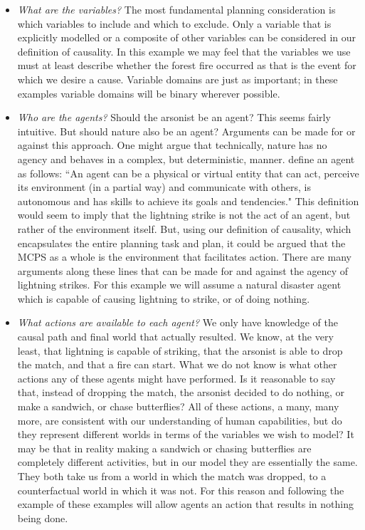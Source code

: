 \documentclass{article}
\theoremstyle{plain}
\theoremstyle{definition}
\begin{document}
\begin{itemize}

\item \textit{What are the variables?} The most fundamental planning consideration is which variables to include and which to exclude. Only a variable that is explicitly modelled or a composite of other variables can be considered in our definition of causality. In this example we may feel that the variables we use must at least describe whether the forest fire occurred as that is the event for which we desire a cause. Variable domains are just as important; in these examples variable domains will be binary wherever possible.

\item \textit{Who are the agents?} Should the arsonist be an agent? This seems fairly intuitive. But should nature also be an agent? Arguments can be made for or against this approach. One might argue that technically, nature has no agency and behaves in a complex, but deterministic, manner. \citet{ferber1999multi} define an agent as follows: ``An agent can be a physical or virtual entity that can act, perceive its environment (in a partial way) and communicate with others, is autonomous and has skills to achieve its goals and tendencies." This definition would seem to imply that the lightning strike is not the act of an agent, but rather of the environment itself. But, using our definition of causality, which encapsulates the entire planning task and plan, it could be argued that the MCPS as a whole is the environment that facilitates action. There are many arguments along these lines that can be made for and against the agency of lightning strikes. For this example we will assume a natural disaster agent which is capable of causing lightning to strike, or of doing nothing.

\item \textit{What actions are available to each agent?} We only have knowledge of the causal path and final world that actually resulted. We know, at the very least, that lightning is capable of striking, that the arsonist is able to drop the match, and that a fire can start. What we do not know is what other actions any of these agents might have performed. Is it reasonable to say that, instead of dropping the match, the arsonist decided to do nothing, or make a sandwich, or chase butterflies? All of these actions, a many, many more, are consistent with our understanding of human capabilities, but do they represent different worlds in terms of the variables we wish to model? It may be that in reality making a sandwich or chasing butterflies are completely different activities, but in our model they are essentially the same. They both take us from a world in which the match was dropped, to a counterfactual world in which it was not. For this reason and following the example of \cite{lind2019ethical} these examples will allow agents an action that results in nothing being done.


\end{itemize}
\end{document}
